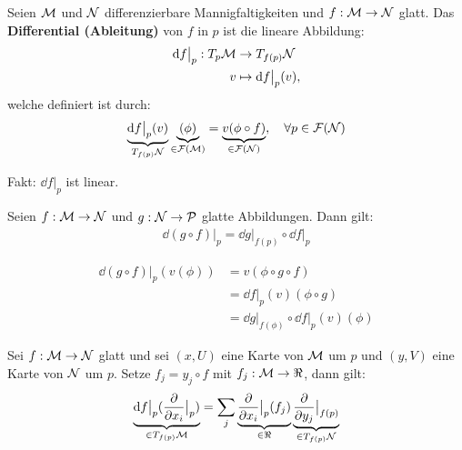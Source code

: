 \begin{defs}
Seien $\mathcal{M}$ und $\mathcal{N}$ differenzierbare Mannigfaltigkeiten und $f: \mathcal{M} \to \mathcal{N}$ glatt.
Das \textbf{Differential (Ableitung)} von $f$ in $p$ ist die lineare Abbildung:
\begin{align}
\dd f \big\vert_p : T_{p} \mathcal{M} &\to T_{f(p)}\mathcal{N} \\
v &\mapsto \dd f \big\vert_p (v),
\end{align}
welche definiert ist durch:
\begin{align}
\underbrace{\dd f \big\vert_p (v)}_{T_{f(p)}\mathcal{N}} \underbrace{(\phi)}_{\in \mathcal{F}(\mathcal{M})} = \underbrace{v(\phi \circ f)}_{\in \mathcal{F}(\mathcal{N})}, \quad \forall p \in \mathcal{F}(\mathcal{N})
\end{align}
\end{defs}
Fakt: $\dd f \big\vert_p$ ist linear.

\begin{satz}[Kettenregel]
\label{satz:Kettenregel}
Seien $f: \mathcal{M} \to \mathcal{N}$ und $g: \mathcal{N} \to \mathcal{P}$ glatte Abbildungen.
Dann gilt:
\begin{align}
\dd (g \circ f) \big\vert_p = \dd g \big\vert_{f(p)} \circ \dd f \big\vert_p
\end{align}
\end{satz}

\begin{bew} \leavevmode
\begin{align}
\dd (g \circ f) \big\vert_{p} (v (\phi)) &= v(\phi \circ g \circ f) \\
&= \dd f \big\vert_p (v)(\phi \circ g) \\
&= \dd g \big\vert_{f(\phi)} \circ \dd f \big\vert_p (v) (\phi)
\end{align}
\end{bew}

\begin{satz}
Sei $f: \mathcal{M} \to \mathcal{N}$ glatt und sei $(x, U)$ eine Karte von $\mathcal{M}$ um $p$ und $(y, V)$ eine Karte von $\mathcal{N}$ um $p$.
Setze $f_j = y_j \circ f$ mit $f_j : \mfk \to \real$, dann gilt:
\begin{align}
\underbrace{\dd f \big\vert_p ( \pdv{x_i} \big\vert_p)}_{\in T_{f(p)}\mfk} = \sum_j \underbrace{\pdv{x_i}\big\vert_p (f_j)}_{\in \real} \underbrace{\pdv{y_j} \big\vert_{f(p)}}_{\in T_{f(p)}\mfka}
\end{align}
\end{satz}

